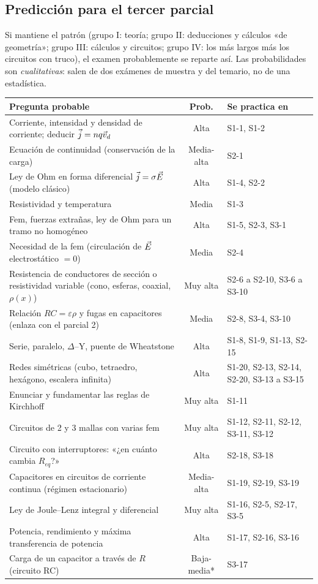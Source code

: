 \documentclass[11pt]{article}
\begin{document}
\subsection{Predicción para el tercer parcial}
Si mantiene el patrón (grupo I: teoría; grupo II: deducciones y cálculos «de geometría»; grupo III: cálculos y circuitos; grupo IV: los más largos más los circuitos con truco), el examen probablemente se reparte así. Las probabilidades son \emph{cualitativas}: salen de dos exámenes de muestra y del temario, no de una estadística.

\begin{center}
\small
\begin{longtable}{@{}p{7.6cm}cp{4.6cm}@{}}
\toprule
\textbf{Pregunta probable} & \textbf{Prob.} & \textbf{Se practica en}\\
\midrule
\endhead
Corriente, intensidad y densidad de corriente; deducir $\vec{j}=nq\vec v_d$ & Alta & S1-1, S1-2\\
Ecuación de continuidad (conservación de la carga) & Media-alta & S2-1\\
Ley de Ohm en forma diferencial $\vec{j}=\sigma\vec{E}$ (modelo clásico) & Alta & S1-4, S2-2\\
Resistividad y temperatura & Media & S1-3\\
Fem, fuerzas extrañas, ley de Ohm para un tramo no homogéneo & Alta & S1-5, S2-3, S3-1\\
Necesidad de la fem (circulación de $\vec{E}$ electrostático $=0$) & Media & S2-4\\
Resistencia de conductores de sección o resistividad variable (cono, esferas, coaxial, $\rho(x)$) & Muy alta & S2-6 a S2-10, S3-6 a S3-10\\
Relación $RC=\varepsilon\rho$ y fugas en capacitores (enlaza con el parcial 2) & Media & S2-8, S3-4, S3-10\\
Serie, paralelo, $\Delta$--Y, puente de Wheatstone & Alta & S1-8, S1-9, S1-13, S2-15\\
Redes simétricas (cubo, tetraedro, hexágono, escalera infinita) & Alta & S1-20, S2-13, S2-14, S2-20, S3-13 a S3-15\\
Enunciar y fundamentar las reglas de Kirchhoff & Muy alta & S1-11\\
Circuitos de 2 y 3 mallas con varias fem & Muy alta & S1-12, S2-11, S2-12, S3-11, S3-12\\
Circuito con interruptores: «¿en cuánto cambia $R_{eq}$?» & Alta & S2-18, S3-18\\
Capacitores en circuitos de corriente continua (régimen estacionario) & Media-alta & S1-19, S2-19, S3-19\\
Ley de Joule--Lenz integral y diferencial & Muy alta & S1-16, S2-5, S2-17, S3-5\\
Potencia, rendimiento y máxima transferencia de potencia & Alta & S1-17, S2-16, S3-16\\
Carga de un capacitor a través de $R$ (circuito RC) & Baja-media* & S3-17\\
\bottomrule
\end{longtable}
\end{center}
\end{document}
